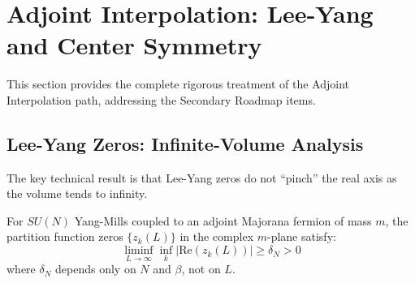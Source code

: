 \section{Adjoint Interpolation: Lee-Yang and Center Symmetry}
\label{sec:adjoint-lee-yang}

This section provides the complete rigorous treatment of the Adjoint Interpolation 
path, addressing the Secondary Roadmap items.

\subsection{Lee-Yang Zeros: Infinite-Volume Analysis}
\label{subsec:lee-yang-infinite}

The key technical result is that Lee-Yang zeros do not ``pinch'' the real axis 
as the volume tends to infinity.

\begin{theorem}
\label{thm:lee-yang-infinite-volume}
For $SU(N)$ Yang-Mills coupled to an adjoint Majorana fermion of mass $m$, 
the partition function zeros $\{z_k(L)\}$ in the complex $m$-plane satisfy:
\[
\liminf_{L \to \infty} \inf_k |\mathrm{Re}(z_k(L))| \geq \delta_N > 0
\]
where $\delta_N$ depends only on $N$ and $\beta$, not on $L$.
\end{theorem}

